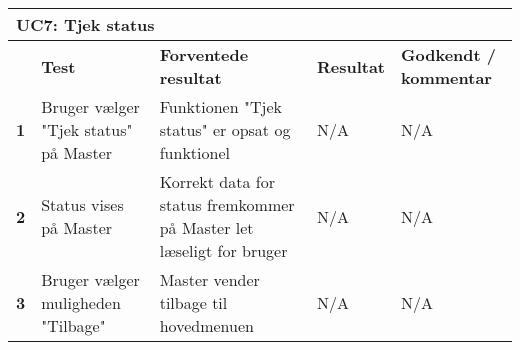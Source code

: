 
\begin{longtable}{|p{5mm}|p{40mm}|p{40mm}|p{20mm}|p{25mm}|}
\hline 
\multicolumn{5}{|l|}{\textbf{UC7: Tjek status}} \\ 
\hline 
& \textbf{Test} & \textbf{Forventede resultat} & \textbf{Resultat} & \textbf{Godkendt / kommentar} \\ 
\hline 
\textbf{1}& Bruger vælger "Tjek status" på Master & Funktionen "Tjek status" er opsat og funktionel & N/A & N/A \\ 
\hline 
\textbf{2}& Status vises på Master & Korrekt data for status fremkommer på Master let læseligt for bruger & N/A & N/A \\ 
\hline 
\textbf{3}& Bruger vælger muligheden "Tilbage" & Master vender tilbage til hovedmenuen & N/A & N/A \\ 
\hline 
\end{longtable} 